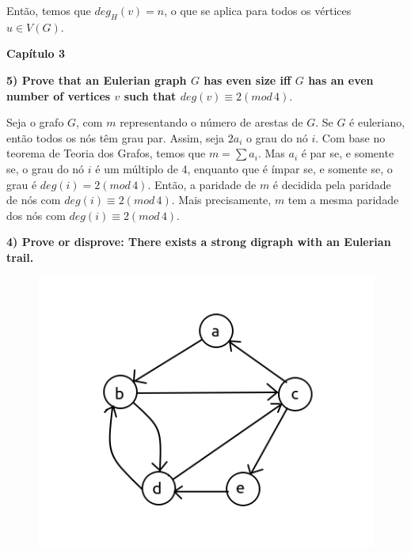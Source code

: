 \documentclass[]{article}
\begin{document}
Então, temos que $deg_H(v) = n$, o que se aplica para todos os vértices $u \in V(G)$.

\newpage

\begin{center}
  \Large\textbf{Capítulo 3}
\end{center}

\textbf{5) Prove that an Eulerian graph $G$ has even size iff $G$ has an even number of vertices $v$ such that $deg(v) \equiv 2 (mod \, 4)$}.

Seja o grafo $G$, com $m$ representando o número de arestas de $G$. Se $G$ é euleriano, então todos os nós têm grau par. Assim, seja $2a_i$ o grau do nó $i$. Com base no teorema de Teoria dos Grafos, temos que $m = \sum a_i$. Mas $a_i$ é par se, e somente se, o grau do nó $i$ é um múltiplo de 4, enquanto que é ímpar se, e somente se, o grau é $deg(i) = 2(mod \, 4)$. Então, a paridade de $m$ é decidida pela paridade de nós com $deg(i) \equiv 2(mod \, 4)$. Mais precisamente, $m$ tem a mesma paridade dos nós com $deg(i) \equiv 2(mod \, 4)$.

\newpage

\textbf{4) Prove or disprove: There exists a strong digraph with an Eulerian trail.}

\begin{figure}[h]
	\begin{center}
		\includegraphics[scale=1]{image/prove.png}
	\end{center}
\end{figure}



\end{document}
